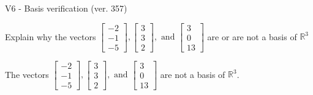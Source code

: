 \begin{exercise}
  \begin{exerciseTitle}V6 - Basis verification (ver. 357)\end{exerciseTitle}
  \begin{exerciseStatement}
    Explain why the vectors \(\left[\begin{array}{r}
-2 \\
-1 \\
-5
\end{array}\right] , \left[\begin{array}{r}
3 \\
3 \\
2
\end{array}\right] , \text{ and } \left[\begin{array}{r}
3 \\
0 \\
13
\end{array}\right]\) are or are not a basis of \(\mathbb{R}^3\)	


  \end{exerciseStatement}
  \begin{exerciseAnswer}
   The vectors \(\left[\begin{array}{r}
-2 \\
-1 \\
-5
\end{array}\right] , \left[\begin{array}{r}
3 \\
3 \\
2
\end{array}\right] , \text{ and } \left[\begin{array}{r}
3 \\
0 \\
13
\end{array}\right]\) 
  	 are not  a basis of \(\mathbb{R}^3\).
  


  \end{exerciseAnswer}
\end{exercise}